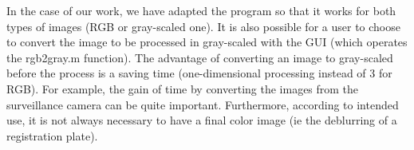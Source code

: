 In the case of our work, we have adapted the program so that it works for both types of images (RGB or gray-scaled one). It is also possible for a user to choose to convert the image to be processed in gray-scaled with the GUI (which operates the rgb2gray.m function). The advantage of converting an image to gray-scaled before the process is a saving time (one-dimensional processing instead of 3 for RGB). For example, the gain of time by converting the images from the surveillance camera can be quite important. Furthermore, according to intended use, it is not always necessary to have a final color image (ie the deblurring of a registration plate).